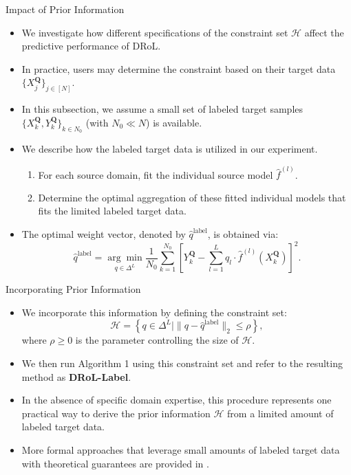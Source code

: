 \documentclass{beamer}
\begin{document}
\begin{frame}{Impact of Prior Information}
    \begin{itemize}
        \item We investigate how different specifications of the constraint set $\mathcal{H}$ affect the predictive performance of DRoL.
        \item In practice, users may determine the constraint based on their target data $\{X_j^{\mathbf{Q}}\}_{j \in [N]}$.
        \item In this subsection, we assume a small set of labeled target samples $\{X_k^{\mathbf{Q}}, Y_k^{\mathbf{Q}}\}_{k \in N_0}$ (with $N_0 \ll N$) is available.
        \item We describe how the labeled target data is utilized in our experiment.
        \begin{enumerate}
            \item For each source domain, fit the individual source model $\widehat{f}^{(l)}$.
            \item Determine the optimal aggregation of these fitted individual models that fits the limited labeled target data.
        \end{enumerate}
        \item The optimal weight vector, denoted by $\widehat{q}^{\mathrm{label}}$, is obtained via:
        \begin{equation*}
            \widehat{q}^{\text{label}} = \underset{q \in \Delta^{L}}{\arg \min} \frac{1}{N_0} \sum_{k=1}^{N_0} \left[ Y_k^{\mathbf{Q}} - \sum_{l=1}^{L} q_l \cdot \widehat{f}^{(l)}(X_k^{\mathbf{Q}}) \right]^2. \tag{5.2}
        \end{equation*}
    \end{itemize}
\end{frame}

\begin{frame}{Incorporating Prior Information}
    \begin{itemize}
        \item We incorporate this information by defining the constraint set:
        \[
        \mathcal{H} = \left\{ q \in \Delta^{L} \mid \| q - \widehat{q}^{\mathrm{label}} \|_2 \leq \rho \right\},
        \]
        where $\rho \geq 0$ is the parameter controlling the size of $\mathcal{H}$.
        \item We then run Algorithm 1 using this constraint set and refer to the resulting method as \textbf{DRoL-Label}.
        \item In the absence of specific domain expertise, this procedure represents one practical way to derive the prior information $\mathcal{H}$ from a limited amount of labeled target data.
        \item More formal approaches that leverage small amounts of labeled target data with theoretical guarantees are provided in \cite{65}.
    \end{itemize}
\end{frame}
\end{document}
